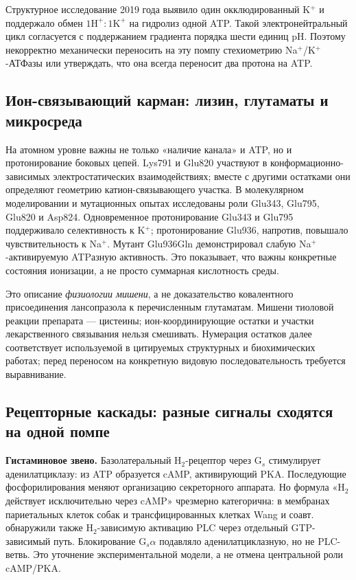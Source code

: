 \documentclass[11pt,a4paper,notitlepage]{report}
\newcommand{\src}[1]{\unskip\space\cite{#1}}
\begin{document}
Структурное исследование 2019 года выявило один окклюдированный K$^+$ и поддержало обмен $1\mathrm{H}^+:1\mathrm{K}^+$ на гидролиз одной ATP. Такой электронейтральный цикл согласуется с поддержанием градиента порядка шести единиц pH. Поэтому некорректно механически переносить на эту помпу стехиометрию Na$^+$/K$^+$-АТФазы или утверждать, что она всегда переносит два протона на ATP.\src{molk}

\subsection{Ион-связывающий карман: лизин, глутаматы и микросреда}
На атомном уровне важны не только «наличие канала» и ATP, но и протонирование боковых цепей. Lys791 и Glu820 участвуют в конформационно-зависимых электростатических взаимодействиях; вместе с другими остатками они определяют геометрию катион-связывающего участка. В молекулярном моделировании и мутационных опытах исследованы роли Glu343, Glu795, Glu820 и Asp824. Одновременное протонирование Glu343 и Glu795 поддерживало селективность к K$^+$; протонирование Glu936, напротив, повышало чувствительность к Na$^+$. Мутант Glu936Gln демонстрировал слабую Na$^+$-активируемую ATPазную активность. Это показывает, что важны конкретные состояния ионизации, а не просто суммарная кислотность среды.\src{molselect}

Это описание \emph{физиологии мишени}, а не доказательство ковалентного присоединения лансопразола к перечисленным глутаматам. Мишени тиоловой реакции препарата --- цистеины; ион-координирующие остатки и участки лекарственного связывания нельзя смешивать. Нумерация остатков далее соответствует используемой в цитируемых структурных и биохимических работах; перед переносом на конкретную видовую последовательность требуется выравнивание.\src{molselect,molcys}

\subsection{Рецепторные каскады: разные сигналы сходятся на одной помпе}
\textbf{Гистаминовое звено.} Базолатеральный H$_2$-рецептор через G$_s$ стимулирует аденилатциклазу: из ATP образуется cAMP, активирующий PKA. Последующие фосфорилирования меняют организацию секреторного аппарата. Но формула «H$_2$ действует исключительно через cAMP» чрезмерно категорична: в мембранах париетальных клеток собак и трансфицированных клетках Wang и соавт. обнаружили также H$_2$-зависимую активацию PLC через отдельный GTP-зависимый путь. Блокирование G$_s\alpha$ подавляло аденилатциклазную, но не PLC-ветвь. Это уточнение экспериментальной модели, а не отмена центральной роли cAMP/PKA.\src{molh2signal,molezrin}
\end{document}
